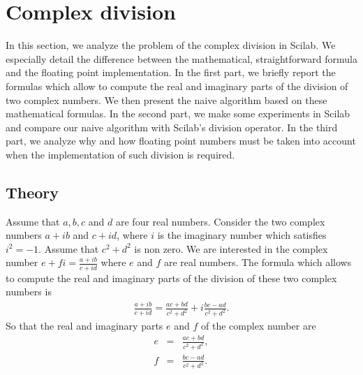 %

\section{Complex division}

In this section, we analyze the problem of the complex division in Scilab.
We especially detail the difference between the mathematical, straightforward
formula and the floating point implementation. In the first part, we briefly report 
the formulas which allow to 
compute the real and imaginary parts of the division of two complex numbers.
We then present the naive algorithm based on these mathematical formulas. 
In the second part, we make some experiments in Scilab and compare our
naive algorithm with Scilab's division operator.
In the third part, we analyze 
why and how floating point numbers must be taken into account when the 
implementation of such division is required.

\subsection{Theory}

Assume that $a,b,c$ and $d$ are four real numbers.
Consider the two complex numbers $a + ib$ and $c + id$, where $i$ is 
the imaginary number which satisfies $i^2=-1$. Assume that $c^2 + d^2$ is non zero.
We are interested in the complex number $e+fi = \frac{a + ib}{c + id}$ where $e$ and $f$ are real
numbers.
The formula which allows to compute the real and imaginary parts 
of the division of these two complex numbers is 
\begin{eqnarray}
\label{compdiv-eq-defcomplexdiv}
\frac{a + ib}{c + id} = \frac{ac + bd}{c^2 + d^2} + i \frac{bc - ad}{c^2 + d^2} .
\end{eqnarray}
So that the real and imaginary parts $e$ and $f$ of the complex number are
\begin{eqnarray}
\label{compdiv-eq-e}
e &=& \frac{ac + bd}{c^2 + d^2}, \\
\label{compdiv-eq-f}
f &=& \frac{bc - ad}{c^2 + d^2}.
\end{eqnarray}

